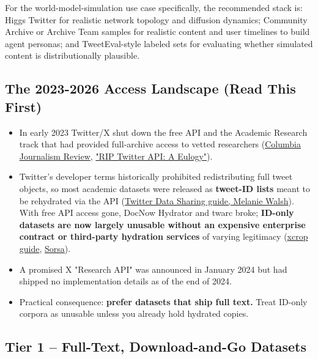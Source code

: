 \documentclass[twocolumn,10pt,letterpaper]{article}
\begin{document}
For the world-model-simulation use case specifically, the recommended stack is: Higgs Twitter for realistic network topology and diffusion dynamics; Community Archive or Archive Team samples for realistic content and user timelines to build agent personas; and TweetEval-style labeled sets for evaluating whether simulated content is distributionally plausible.


\subsection{The 2023-2026 Access Landscape (Read This First)}

\begin{itemize}
\setlength{\itemsep}{0pt}
\setlength{\parskip}{0pt}
  \item In early 2023 Twitter/X shut down the free API and the Academic Research track that had provided full-archive access to vetted researchers (\href{https://www.cjr.org/tow\_center/qa-what-happened-to-academic-research-on-twitter.php}{Columbia Journalism Review}, \href{https://arxiv.org/pdf/2404.07340}{"RIP Twitter API: A Eulogy"}).
  \item Twitter's developer terms historically prohibited redistributing full tweet objects, so most academic datasets were released as \textbf{tweet-ID lists} meant to be rehydrated via the API (\href{https://melaniewalsh.github.io/Intro-Cultural-Analytics/04-Data-Collection/13-Twitter-Data-Sharing.html}{Twitter Data Sharing guide, Melanie Walsh}). With free API access gone, DocNow Hydrator and twarc broke; \textbf{ID-only datasets are now largely unusable without an expensive enterprise contract or third-party hydration services} of varying legitimacy (\href{https://xcrop.io/blog/twitter-data-academic-research}{xcrop guide}, \href{https://api.sorsa.io/solutions/academic-research}{Sorsa}).
  \item A promised X "Research API" was announced in January 2024 but had shipped no implementation details as of the end of 2024.
  \item Practical consequence: \textbf{prefer datasets that ship full text.} Treat ID-only corpora as unusable unless you already hold hydrated copies.
\end{itemize}

\subsection{Tier 1 -- Full-Text, Download-and-Go Datasets}
\end{document}
